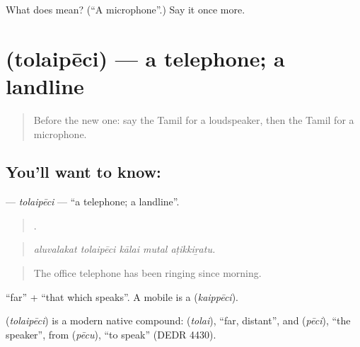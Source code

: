 \begin{tcolorbox}[breakable,colback=teal!4,colframe=teal!35!black,title={Before you move on}]
What does  mean? (\textquotedblleft{}A microphone\textquotedblright{}.) Say it once more.
\end{tcolorbox}
\section[\texorpdfstring{\ta{தொலைபேசி} (tolaipēci)}{தொலைபேசி (tolaipēci)}]{ (tolaipēci) — a telephone; a landline}

\label{lesson:TA-C519-tolaipeci}



\begin{quote}
Before the new one: say the Tamil for a loudspeaker, then the Tamil for a microphone.
\end{quote}

\subsection*{You'll want to know: }
\textbf{} — \emph{tolaipēci} — \textquotedblleft{}a telephone; a landline\textquotedblright{}.

\begin{quote}
    .
\end{quote}

\begin{quote}
\emph{aluvalakat tolaipēci kālai mutal aṭikkiṟatu.}
\end{quote}

\begin{quote}
The office telephone has been ringing since morning.
\end{quote}

 \textquotedblleft{}far\textquotedblright{} +  \textquotedblleft{}that which speaks\textquotedblright{}. A mobile is a  (\emph{kaippēci}).

\begin{cousinweb}
\textbf{} (\emph{tolaipēci}) is a modern native compound:  (\emph{tolai}), \textquotedblleft{}far, distant\textquotedblright{}, and  (\emph{pēci}), \textquotedblleft{}the speaker\textquotedblright{}, from  (\emph{pēcu}), \textquotedblleft{}to speak\textquotedblright{} (DEDR 4430).
\end{cousinweb}


